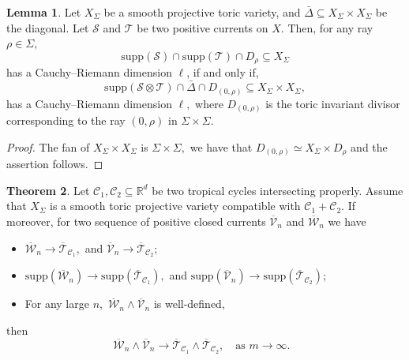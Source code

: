 \documentclass[11pt]{amsart}
\theoremstyle{definition}
\newtheorem{theorem}{Theorem}[section]
\newtheorem{lemma}[theorem]{Lemma}
\newcommand{\R}{\mathbb{R}}
\newcommand{\lto}{\longrightarrow}
\newcommand{\cC}{\mathcal{C}}
\newcommand{\sT}{\mathscr{T}}
\newcommand{\sS}{\mathscr{S}}
\newcommand{\sW}{\mathscr{W}}
\newcommand{\sV}{\mathscr{V}}
\newcommand{\supp}[1]{{\mathrm{supp}(#1)}}
\begin{document}
 \begin{lemma}\label{lem:diag-int}
   Let $X_{\Sigma}$ be a smooth projective toric variety, and $\bar{\Delta} \subseteq X_{\Sigma}\times X_{\Sigma}$ be the diagonal. Let $\sS$ and $\sT$ be two positive currents on $X.$ Then, for any ray $\rho \in \Sigma,$
$$
\supp{\sS} \cap \supp{\sT} \cap D_{\rho} \subseteq X_{\Sigma}
$$
has a Cauchy--Riemann dimension $\ell$, if and only if,
$$
\supp{\sS \otimes \sT} \cap \bar{\Delta} \cap D_{(0,\rho)} \subseteq X_{\Sigma} \times X_{\Sigma},
$$
has a Cauchy--Riemann dimension  $\ell,$ where $D_{(0,\rho)}$ is the toric invariant divisor corresponding to the ray $(0, \rho)$ in $\Sigma \times \Sigma.$
 \end{lemma}
\begin{proof}
    The fan of $X_{\Sigma} \times X_{\Sigma}$ is $\Sigma \times {\Sigma},$ we have that   $D_{(0, \rho)}\simeq X_{\Sigma} \times D_{\rho}$ and the assertion follows. 
\end{proof}
\begin{theorem}\label{thm:int-general}
    Let $\cC_1, \cC_2\subseteq \R^d$ be two tropical cycles intersecting properly. Assume that $X_{\Sigma}$ is a smooth toric projective variety compatible with $\cC_1 +\cC_2.$ If moreover, for two sequence of positive closed currents $\overline{\sV}_n$ and $\overline{\sW}_n$ we have 
\begin{itemize}
    \item [(a)] $\overline{\sW}_n \lto \overline{\sT}_{\cC_1},$ and $\overline{\sV}_n \lto \overline{\sT}_{\cC_2};$
   \item [(b)] $\supp{\overline{\sW}_n} \lto \supp{\overline{\sT}_{\cC_1}},$ and  $\supp{\overline{\sV}_n} \lto \supp{\overline{\sT}_{\cC_2}};$ 
 \item [(c)] For any large $n,$ $\overline{\sW}_n \wedge  \overline{\sV}_n$  is well-defined,
\end{itemize}
 then 
$$
\overline{\sW}_n \wedge \overline{\sV}_n \lto \overline{\sT}_{\cC_1} \wedge \overline{\sT}_{\cC_2}, \quad \text{as $m\to \infty.$ }
$$
 
\end{theorem}
\end{document}
